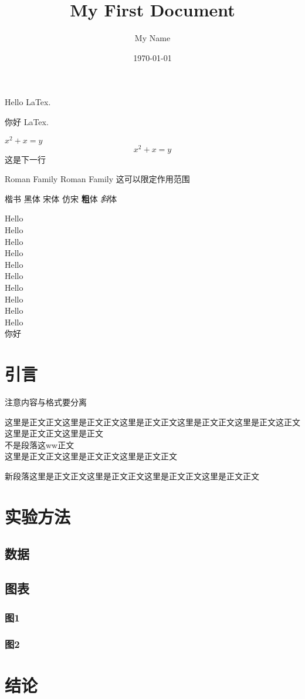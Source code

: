 \documentclass[12pt]{article} %
\title{\heiti My First Document} %
\author{My Name} %
\date{\today} %
\begin{document}
	Hello LaTex.

	你好 LaTex.

	$x^2 + x = y$ %
	$$x^2 + x = y$$ %
	这是下一行
	
	\textrm{Roman Family}
	{\rmfamily  Roman Family 这可以限定作用范围}
	
	\kaishu 楷书    \heiti 黑体 \songti 宋体 \fangsong 仿宋
	\textbf 粗体   \textit 斜体

	{\tiny		Hello}\\
	{\scriptsize		Hello}\\
	{\footnotesize		Hello}\\
	{\small		Hello}\\
	{\normalsize		Hello}\\
	{\large		Hello}\\
	{\Large		Hello}\\
	{\LARGE		Hello}\\
	{\huge		Hello}\\
	{\Huge		Hello}\\
	
	 你好   %
	
	\section{引言}
		{ 注意内容与格式要分离}
		
		这里是正文正文这里是正文正文这里是正文正文这里是正文正文这里是正文这正文这里是正文正文这里是正文\\不是段落这ww正文\\
		这里是正文正文这里是正文正文这里是正文正文\par 新段落这里是正文正文这里是正文正文这里是正文正文这里是正文正文
	\section{实验方法}
	\subsection{数据}
	\subsection{图表}
	\subsubsection{图1}
	\subsubsection{图2}
	\section{结论}
\end{document}
